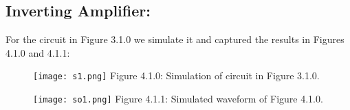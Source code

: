 \subsection{Inverting Amplifier:}

For the circuit in Figure 3.1.0 we simulate it and captured the results in Figures 4.1.0 and 4.1.1:

\begin{figure}[H]
\texttt{[image: s1.png]}
\centering \linebreak \linebreak Figure 4.1.0: Simulation of circuit in Figure 3.1.0.
\end{figure} \hfill

\begin{figure}[H]
\texttt{[image: so1.png]}
\centering \linebreak \linebreak Figure 4.1.1: Simulated waveform of Figure 4.1.0.
\end{figure} \hfill

\pagebreak